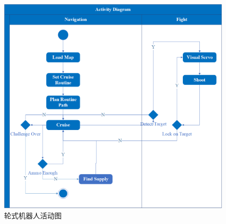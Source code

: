 \begin{figure}[h]
  \centering
  \includegraphics[width=\textwidth]{figures/activity.png}
  \caption{轮式机器人活动图}\label{activity}
\end{figure}
